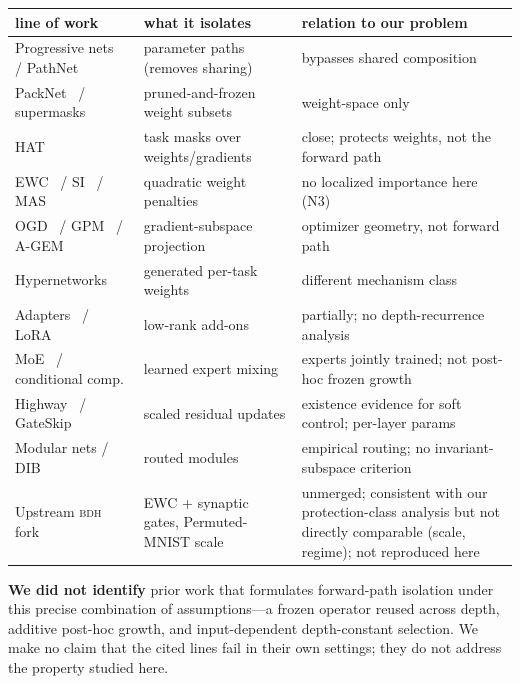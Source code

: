 \documentclass[11pt]{article}
\theoremstyle{definition}\newtheorem{definition}{Definition}
\theoremstyle{remark}\newtheorem{remark}{Remark}
\newcommand{\BDH}{\textsc{bdh}}
\begin{document}
\begin{table}[h]
\centering\small
\begin{tabular}{p{3.4cm}p{4.3cm}l}
\toprule
line of work & what it isolates & relation to our problem \\
\midrule
Progressive nets~\cite{pgn} / PathNet~\cite{pathnet} & parameter paths (removes sharing) & bypasses shared composition \\
PackNet~\cite{packnet} / supermasks & pruned-and-frozen weight subsets & weight-space only \\
HAT~\cite{hat} & task masks over weights/gradients & close; protects weights, not the forward path \\
EWC~\cite{ewc} / SI~\cite{si} / MAS & quadratic weight penalties & no localized importance here (N3) \\
OGD~\cite{ogd} / GPM~\cite{gpm} / A-GEM~\cite{agem} & gradient-subspace projection & optimizer geometry, not forward path \\
Hypernetworks~\cite{hypercl} & generated per-task weights & different mechanism class \\
Adapters~\cite{adapter} / LoRA~\cite{lora} & low-rank add-ons & partially; no depth-recurrence analysis \\
MoE~\cite{moe} / conditional comp. & learned expert mixing & experts jointly trained; not post-hoc frozen growth \\
Highway~\cite{highway} / GateSkip & scaled residual updates & existence evidence for soft control; per-layer params \\
Modular nets / DIB & routed modules & empirical routing; no invariant-subspace criterion \\
Upstream \BDH{} fork~\cite{fork} & EWC + synaptic gates, Permuted-MNIST scale & unmerged; consistent with our
protection-class analysis but not directly comparable (scale, regime); not reproduced here \\
\bottomrule
\end{tabular}
\end{table}

\noindent \textbf{We did not identify} prior work that formulates forward-path isolation
under this precise combination of assumptions---a frozen operator reused across depth,
additive post-hoc growth, and input-dependent depth-constant selection. We make no claim
that the cited lines fail in their own settings; they do not address the property studied
here.
\end{document}
